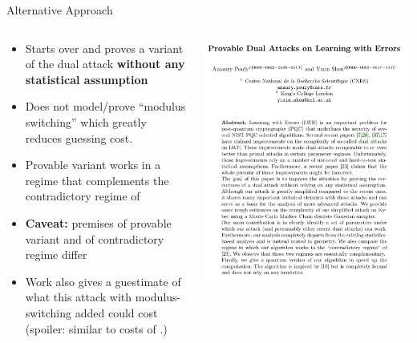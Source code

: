 \documentclass[xcolor=table,10pt,aspectratio=169]{beamer}
\begin{document}
\begin{frame}[label={sec:org7eb2500}]{Alternative Approach}
\begin{columns}
\begin{column}{0.55\columnwidth}
\begin{itemize}
\item Starts over and proves a variant of the dual attack \textbf{without any statistical assumption}
\item Does not model/prove ``modulus switching'' which greatly reduces guessing cost.
\item Provable variant works in a regime that complements the contradictory regime of \cite{EPRINT:DucPul23}
\item \textbf{Caveat:} premises of provable variant and of contradictory regime differ
\item Work also gives a guestimate of what this attack with modulus-switching added could cost (spoiler: similar to costs of \cite{Matzov22}.)
\end{itemize}
\end{column}

\begin{column}{0.45\columnwidth}
\begin{center}
\includegraphics[keepaspectratio,height=.8\textheight]{./yixin.png}
\end{center}
\end{column}
\end{columns}
\end{frame}
\end{document}
